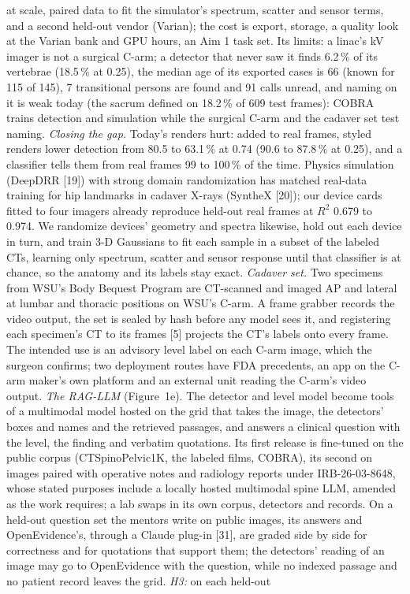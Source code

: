 \documentclass[10pt,letterpaper]{article}
\newcommand{\pct}{\,\%}
\begin{document}
at scale, paired data to fit the simulator's spectrum, scatter and sensor terms, and a second held-out
vendor (Varian); the cost is export, storage, a quality look at the Varian bank and GPU hours, an Aim 1 task set. Its limits: a linac's kV imager is not a surgical C-arm; a
detector that never saw it finds 6.2\pct{} of its vertebrae (18.5\pct{} at 0.25), the median age of its exported cases is 66 (known for 115 of 145), 7 transitional persons are found and 91 calls unread, and naming on it is weak today (the sacrum defined on 18.2\pct{} of
609 test frames): COBRA trains detection and simulation while the surgical C-arm and the cadaver set test naming. \emph{Closing the
gap.} Today's renders hurt: added to real frames, styled renders lower detection from 80.5 to 63.1\pct{} at 0.74
(90.6 to 87.8\pct{} at 0.25), and a classifier tells them from real frames 99 to 100\pct{} of the time. Physics
simulation (DeepDRR [19]) with strong domain randomization has matched real-data training for hip landmarks in
cadaver X-rays (SyntheX [20]); our device cards fitted to four imagers already reproduce held-out real frames at $R^2$
0.679 to 0.974. We randomize devices' geometry and spectra likewise, hold out each device in turn, and train 3-D
Gaussians to fit each sample in a subset of the labeled CTs, learning only spectrum, scatter and sensor
response until that classifier is at chance, so the anatomy and its labels stay exact. \emph{Cadaver set.} Two
specimens from WSU's Body Bequest Program are CT-scanned and imaged AP and lateral at lumbar and thoracic positions
on WSU's C-arm. A frame grabber records the video output, the set is sealed by hash before any model sees it, and
registering each specimen's CT to its frames [5] projects the CT's labels onto every frame. The intended use is an
advisory level label on each C-arm image, which the surgeon confirms; two deployment routes have FDA precedents, an
app on the C-arm maker's own platform and an external unit reading the C-arm's video output. \emph{The RAG-LLM} (Figure~1e). The detector and level model become tools of a multimodal model hosted on the grid that
takes the image, the detectors' boxes and names and the retrieved passages, and answers a clinical question with the
level, the finding and verbatim quotations. Its first release is fine-tuned on the public corpus (CTSpinoPelvic1K, the
labeled films, COBRA), its second on images paired with operative notes and radiology reports under
IRB-26-03-8648, whose stated purposes include a locally hosted multimodal spine LLM, amended as the work requires; a lab swaps
in its own corpus, detectors and records. On a held-out question set the mentors write on public images, its answers and OpenEvidence's, through a Claude plug-in [31], are graded side by side for correctness and for quotations that support them; the detectors' reading of an image may go to OpenEvidence with the question, while no indexed passage and no patient record leaves the grid. \emph{H3:} on each held-out
\end{document}
